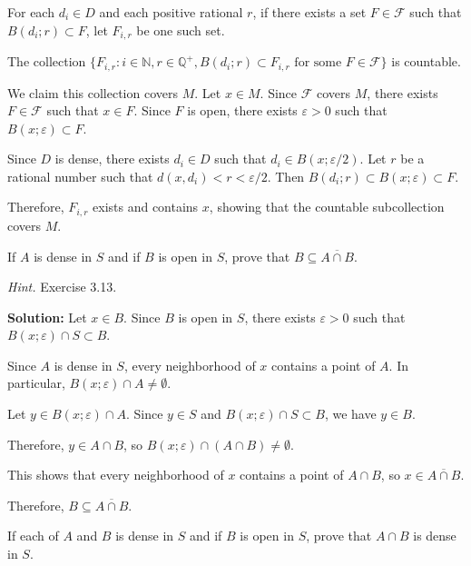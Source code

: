 For each $d_i \in D$ and each positive rational $r$, if there exists a set $F \in \mathcal{F}$ such that $B(d_i;r) \subset F$, let $F_{i,r}$ be one such set.

The collection $\{F_{i,r} : i \in \mathbb{N}, r \in \mathbb{Q}^+, B(d_i;r) \subset F_{i,r} \text{ for some } F \in \mathcal{F}\}$ is countable.

We claim this collection covers $M$. Let $x \in M$. Since $\mathcal{F}$ covers $M$, there exists $F \in \mathcal{F}$ such that $x \in F$. Since $F$ is open, there exists $\varepsilon > 0$ such that $B(x;\varepsilon) \subset F$.

Since $D$ is dense, there exists $d_i \in D$ such that $d_i \in B(x;\varepsilon/2)$. Let $r$ be a rational number such that $d(x,d_i) < r < \varepsilon/2$. Then $B(d_i;r) \subset B(x;\varepsilon) \subset F$.

Therefore, $F_{i,r}$ exists and contains $x$, showing that the countable subcollection covers $M$.

\begin{problembox}
If \( A \) is dense in \( S \) and if \( B \) is open in \( S \), prove that \( B \subseteq \overline{A \cap B} \).

\textit{Hint.} Exercise 3.13.
\end{problembox}

\textbf{Solution:} Let $x \in B$. Since $B$ is open in $S$, there exists $\varepsilon > 0$ such that $B(x;\varepsilon) \cap S \subset B$.

Since $A$ is dense in $S$, every neighborhood of $x$ contains a point of $A$. In particular, $B(x;\varepsilon) \cap A \neq \emptyset$.

Let $y \in B(x;\varepsilon) \cap A$. Since $y \in S$ and $B(x;\varepsilon) \cap S \subset B$, we have $y \in B$.

Therefore, $y \in A \cap B$, so $B(x;\varepsilon) \cap (A \cap B) \neq \emptyset$.

This shows that every neighborhood of $x$ contains a point of $A \cap B$, so $x \in \overline{A \cap B}$.

Therefore, $B \subseteq \overline{A \cap B}$.

\begin{problembox}
If each of \( A \) and \( B \) is dense in \( S \) and if \( B \) is open in \( S \), prove that \( A \cap B \) is dense in \( S \).
\end{problembox}

